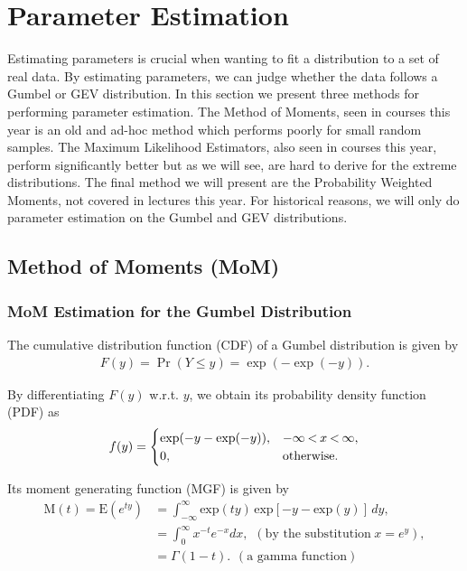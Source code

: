 \documentclass{article}
\begin{document}
\newpage

\section{Parameter Estimation}

Estimating parameters is crucial when wanting to fit a distribution to a set of real data.
By estimating parameters, we can judge whether the data follows a Gumbel or GEV distribution. In this section we present three methods for performing parameter estimation. The Method of Moments, seen in courses this year is an old and ad-hoc method which performs poorly for small random samples. The Maximum Likelihood Estimators, also seen in courses this year, perform significantly better but as we will see, are hard to derive for the extreme distributions. The final method we will present are the Probability Weighted Moments, not covered in lectures this year. For historical reasons, we will only do parameter estimation on the Gumbel and GEV distributions.
\subsection{Method of Moments (MoM)}
\subsubsection{MoM Estimation for the Gumbel Distribution}

The cumulative distribution function (CDF) of a Gumbel distribution is given by
\begin{align*}
F(y) = \Pr(Y\leq y) = \exp(-\exp(-y)).
\end{align*}

By differentiating $F(y)$ w.r.t. $y$, we obtain its probability density function (PDF) as
\[ f(y) = \begin{cases}
\textrm{exp}(-y-\textrm{exp}(-y)), &  -\infty \hspace{2pt} \textrm{\textless} \hspace{2pt} x \hspace{2pt} \textrm{\textless} \hspace{2pt} \infty, \\
0, & \textrm{otherwise}.
\end{cases} \]

Its moment generating function (MGF) is given by
\begin{align*}
\textrm{M}(t) = \textrm{E}(e^{ty}) &= \int_{-\infty}^{\infty}\textrm{exp}(ty)\hspace{2pt}\textrm{exp}[-y-\textrm{exp}(y)] \hspace{2pt} d y, \\
&= \int_{0}^{\infty}x^{-t}e^{-x} d x, \hspace{5pt} (\textrm{by the substitution} \hspace{3pt} x = e^{y}), \\
&= \Gamma(1-t). \hspace{5pt} (\textrm{a gamma function})
\end{align*}
\end{document}
